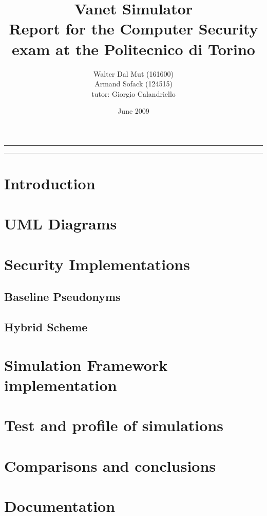 \documentclass[a4paper,12pt]{article}
\def\baseline{Baseline Pseudonyms~}
\def\hybrid{Hybrid Scheme~}
\begin{document}
\title{Vanet Simulator
\\
{\normalsize Report for the Computer Security exam at the Politecnico di Torino}
}
\author{Walter Dal Mut (161600)\\Armand Sofack (124515)
\\
{\normalsize tutor: Giorgio Calandriello}
}
\date{June 2009}
\maketitle

\vfill

\rule{\textwidth}{1pt}

\tableofcontents

\rule{\textwidth}{1pt}

\vfill

\newpage
\section{Introduction}
\section{UML Diagrams}

\section{Security Implementations}
\subsection{\baseline}

\subsection{\hybrid}
\section{Simulation Framework implementation}

\section{Test and profile of simulations}
\section{Comparisons and conclusions}
\section{Documentation}
\end{document}
